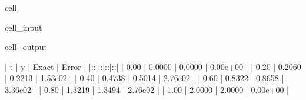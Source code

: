 \documentclass[letterpaper,10pt,english]{jupyterBook}
\begin{document}
\begin{sphinxuseclass}{cell}
\begin{sphinxVerbatimInput}
\begin{sphinxuseclass}{cell_input}
\begin{sphinxVerbatim}[commandchars=\\\{\}]
   \PYG{p}{[}\PYG{p}{]} 
  
    
   
   
 
 
\end{sphinxVerbatim}

\end{sphinxuseclass}\end{sphinxVerbatimInput}
\begin{sphinxVerbatimOutput}

\begin{sphinxuseclass}{cell_output}
\begin{sphinxVerbatim}[commandchars=\\\{\}]
|  t   |   y    | Exact  |  Error   |
|:\PYGZhy{}\PYGZhy{}\PYGZhy{}\PYGZhy{}:|:\PYGZhy{}\PYGZhy{}\PYGZhy{}\PYGZhy{}\PYGZhy{}\PYGZhy{}:|:\PYGZhy{}\PYGZhy{}\PYGZhy{}\PYGZhy{}\PYGZhy{}\PYGZhy{}:|:\PYGZhy{}\PYGZhy{}\PYGZhy{}\PYGZhy{}\PYGZhy{}\PYGZhy{}\PYGZhy{}\PYGZhy{}:|
| 0.00 | 0.0000 | 0.0000 | 0.00e+00 |
| 0.20 | 0.2060 | 0.2213 | 1.53e\PYGZhy{}02 |
| 0.40 | 0.4738 | 0.5014 | 2.76e\PYGZhy{}02 |
| 0.60 | 0.8322 | 0.8658 | 3.36e\PYGZhy{}02 |
| 0.80 | 1.3219 | 1.3494 | 2.76e\PYGZhy{}02 |
| 1.00 | 2.0000 | 2.0000 | 0.00e+00 |
\end{sphinxVerbatim}

\noindent{}

\end{sphinxuseclass}\end{sphinxVerbatimOutput}

\end{sphinxuseclass}
\end{document}
